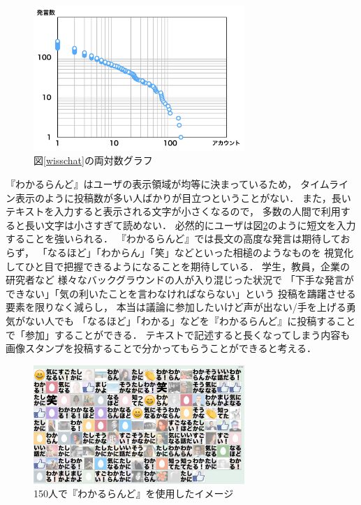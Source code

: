 \begin{figure}[h]
\centering\includegraphics[width=8cm]{images/powerlaw.png}
\caption{図\ref{wisschat}の両対数グラフ}
\label{powerlaw}
\end{figure}

『わかるらんど』はユーザの表示領域が均等に決まっているため，
タイムライン表示のように投稿数が多い人ばかりが目立つということがない．
また，長いテキストを入力すると表示される文字が小さくなるので，
多数の人間で利用すると長い文字は小さすぎて読めない．
必然的にユーザは図\ref{wakaruland150}のように短文を入力することを強いられる．
『わかるらんど』では長文の高度な発言は期待しておらず，
「なるほど」「わからん」「笑」などといった相槌のようなものを
視覚化してひと目で把握できるようになることを期待している．
学生，教員，企業の研究者など
様々なバックグラウンドの人が入り混じった状況で
「下手な発言ができない」「気の利いたことを言わなければならない」という
投稿を躊躇させる要素を限りなく減らし，
本当は議論に参加したいけど声が出ない/手を上げる勇気がない人でも
「なるほど」「わかる」などを『わかるらんど』に投稿することで「参加」することができる．
テキストで記述すると長くなってしまう内容も
画像スタンプを投稿することで分かってもらうことができると考える．


\begin{figure}[h]
\centering
\includegraphics[width=8cm]{images/wakaruland150.png}
\caption{150人で『わかるらんど』を使用したイメージ}
\label{wakaruland150}
\end{figure}


